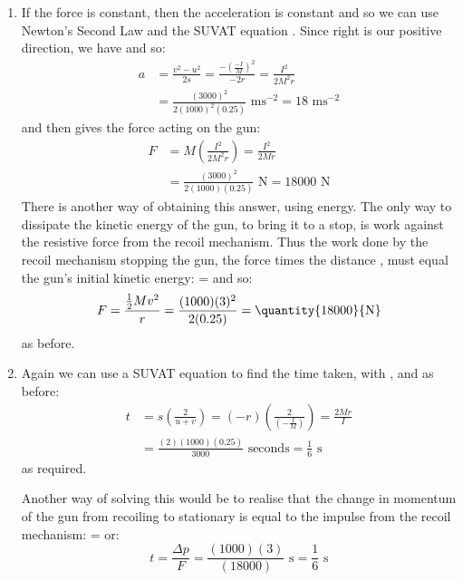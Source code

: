 \begin{problem}[A1972AMIIQ2l]
{\begin{enumerate}
Impulse is measured in  (kilogram metres per second) or  (Newton seconds), where the former is expressed in SI base units but the two are completely equivalent (this can be shown by substituting in the definition  $\equiv$ ). Energy is measured in  (Joules) or  (kilogram meters squared per second squared), again equivalent units.
	\item If the force is constant, then the acceleration is constant and so we can use Newton's Second Law and the SUVAT equation . Since right is our positive direction, we have \value{s}{-r}{,}  and  so:
\begin{align*} 
a &= \frac{v^{2} - u^{2}}{2s} = \frac{-\left( \frac{-I}{M} \right)^{2}}{-2r} = \frac{I^{2}}{2M^{2}r} \\ 
&= \frac{(3000)^{2}}{2(1000)^{2}(0.25)} \text{ ms}^{-2} = 18 \text{ ms}^{-2} 
\end{align*}
and then \value{F}{ma}{} gives the force acting on the gun:
\begin{align*} 
F &= M \left( \frac{I^{2}}{2M^{2}r} \right) = \frac{I^{2}}{2Mr} \\ 
&= \frac{(3000)^{2}}{2(1000)(0.25)} \text{ N} = 18000 \text{ N} 
\end{align*}
There is another way of obtaining this answer, using energy. The only way to dissipate the kinetic energy of the gun, to bring it to a stop, is work against the resistive force from the recoil mechanism. Thus the work done by the recoil mechanism stopping the gun, the force times the distance , must equal the gun's initial kinetic energy:  =  and so:
\begin{equation*} 
F = \frac{\frac{1}{2}Mv^{2}}{r} = \frac{(1000)(3)^{2}}{2(0.25)} = \mbox{\quantity{18000}{N}} 
\end{equation*} as before.

	\item Again we can use a SUVAT equation to find the time taken,  with ,  and  as before:
\begin{align*} 
t &= s \left( \frac{2}{u + v} \right) = (-r) \left( \frac{2}{\left( -\frac{I}{M} \right)} \right) = \frac{2Mr}{I} \\ 
&= \frac{(2)(1000)(0.25)}{3000} \text{ seconds} = \frac{1}{6} \text{ s} 
\end{align*} as required.

Another way of solving this would be to realise that the change in momentum of the gun from recoiling to stationary is equal to the impulse from the recoil mechanism:  =  or:
\begin{equation*} 
t = \frac{\Delta p}{F} = \frac{(1000)(3)}{(18000)} \text{ s} = \frac{1}{6} \text{ s}
 \end{equation*}

\end{enumerate}}
\end{problem}